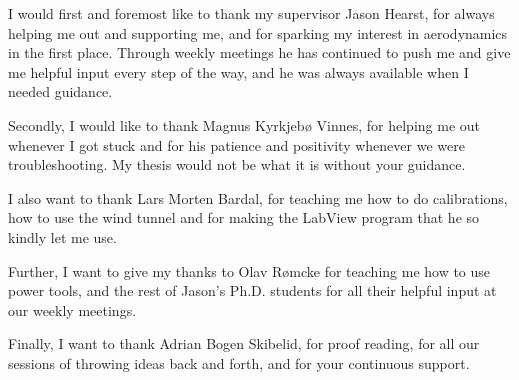 I would first and foremost like to thank my supervisor Jason Hearst, for always helping me out and supporting me, and for sparking my interest in aerodynamics in the first place. Through weekly meetings he has continued to push me and give me helpful input every step of the way, and he was always available when I needed guidance.  

Secondly, I would like to thank Magnus Kyrkjebø Vinnes, for helping me out whenever I got stuck and for his patience and positivity whenever we were troubleshooting. My thesis would not be what it is without your guidance. 

I also want to thank Lars Morten Bardal, for teaching me how to do calibrations, how to use the wind tunnel and for making the LabView program that he so kindly let me use.  

Further, I want to give my thanks to Olav Rømcke for teaching me how to use power tools, and the rest of Jason's Ph.D. students for all their helpful input at our weekly meetings.  

Finally, I want to thank Adrian Bogen Skibelid, for proof reading, for all our sessions of throwing ideas back and forth, and for your continuous support.   
